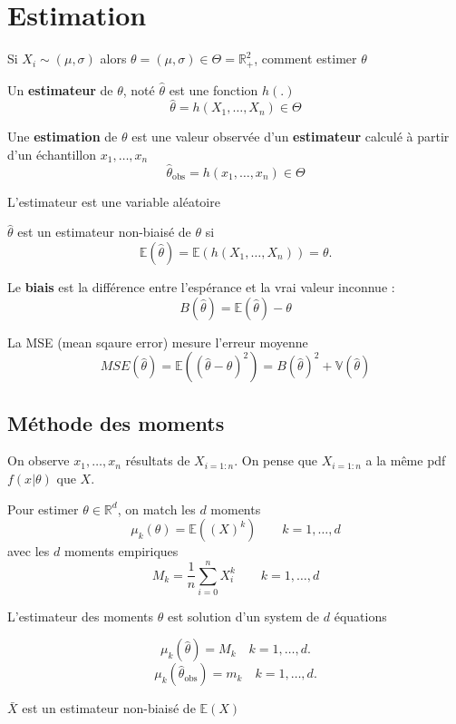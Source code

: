 \documentclass[12pt,a4paper]{article}
\begin{document}
\break

\section{Estimation}

Si $X_i \sim (\mu,\sigma)$ alors $\theta = (\mu,\sigma) \in \Theta = \mathbb{R}_+^2$, comment estimer $\theta$

Un \textbf{estimateur} de $\theta$, noté $\hat{\theta}$ est une fonction $h(.)$ 
$$\hat{\theta} = h(X_1,\dots, X_n) \in \Theta$$

Une \textbf{estimation} de $\theta$ est une valeur observée d'un \textbf{estimateur} calculé à partir d'un échantillon $x_1,\dots,x_n$
$$\hat{\theta}_\text{obs} = h(x_1,\dots,x_n) \in \Theta$$

L'estimateur est une variable aléatoire

\medskip

$\hat{\theta}$ est un estimateur non-biaisé de $\theta$ si
$$\mathbb{E}(\widehat{\theta}) = \mathbb{E}(h(X_1, \dots, X_n)) = \theta.$$

Le \textbf{biais} est la différence entre l'espérance et la vrai valeur inconnue :
$$B(\hat{\theta}) = \mathbb{E}(\hat{\theta}) - \theta$$

La MSE (mean sqaure error) mesure l'erreur moyenne
$$MSE(\hat{\theta}) = \mathbb{E}\left(\left(\hat{\theta}-\theta\right)^2\right) = B(\hat{\theta})^2 + \mathbb{V}(\hat{\theta})$$



\subsection{Méthode des moments}

On observe $x_1,\dots,x_n$ résultats de $X_{i=1:n}$. On pense que $X_{i=1:n}$ a la même pdf $f(x|\theta)$ que $X$.

Pour estimer $\theta \in \mathbb{R}^d$, on match les $d$ moments
$$\mu_k(\theta) = \mathbb{E}\left((X)^k\right) \qquad k = 1,\dots,d$$
avec les $d$ moments empiriques
$$M_k = \frac{1}{n}\sum_{i=0}^n X_i^k \qquad k=1,\dots,d$$

L'estimateur des moments $\hat{\theta}$ est solution d'un system de $d$ équations

$$\mu_k(\hat{\theta}) = M_k \quad k = 1, \dots, d.$$
$$\mu_k(\hat{\theta}_{\text{obs}}) = m_k \quad k = 1, \dots, d.$$

\bigskip

$\bar{X}$ est un estimateur non-biaisé de $\mathbb{E}(X)$
\end{document}
